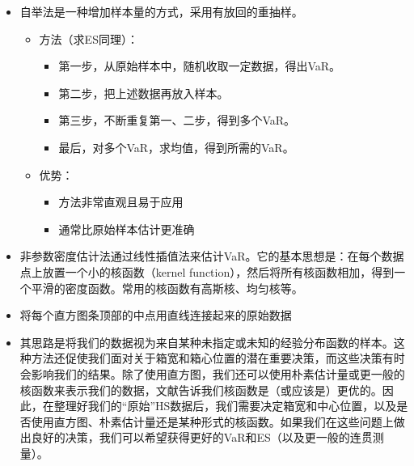 \begin{itemize}
    




\item 自举法是一种增加样本量的方式，采用有放回的重抽样。

\begin{itemize}
    \item 方法（求ES同理）：
    \begin{itemize}
        \item 第一步，从原始样本中，随机收取一定数据，得出VaR。
        \item 第二步，把上述数据再放入样本。
        \item 第三步，不断重复第一、二步，得到多个VaR。
        \item 最后，对多个VaR，求均值，得到所需的VaR。
    \end{itemize}
    \item 优势：
    \begin{itemize}
        \item 方法非常直观且易于应用
        \item 通常比原始样本估计更准确
    \end{itemize}
\end{itemize}

\item 非参数密度估计法通过线性插值法来估计VaR。它的基本思想是：在每个数据点上放置一个小的核函数（kernel function），然后将所有核函数相加，得到一个平滑的密度函数。常用的核函数有高斯核、均匀核等。
\item 将每个直方图条顶部的中点用直线连接起来的原始数据

\item 其思路是将我们的数据视为来自某种未指定或未知的经验分布函数的样本。这种方法还促使我们面对关于箱宽和箱心位置的潜在重要决策，而这些决策有时会影响我们的结果。除了使用直方图，我们还可以使用朴素估计量或更一般的核函数来表示我们的数据，文献告诉我们核函数是（或应该是）更优的。因此，在整理好我们的“原始”HS数据后，我们需要决定箱宽和中心位置，以及是否使用直方图、朴素估计量还是某种形式的核函数。如果我们在这些问题上做出良好的决策，我们可以希望获得更好的VaR和ES（以及更一般的连贯测量）。

\end{itemize}







